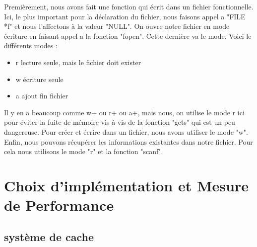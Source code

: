 \documentclass[12pt,a4paper]{article}
\begin{document}
\quad Premièrement, nous avons fait une fonction qui écrit dans un fichier fonctionnelle. Ici, le plus important
pour la déclaration du fichier, nous faisons appel a "FILE *f" et nous l'affectons à la valeur "NULL". On ouvre notre fichier en mode écriture en faisant appel a la fonction "fopen". Cette dernière va le mode. Voici le différents modes :
\begin{itemize}
    \item r {lecture seule, mais le fichier doit exister}
    \item w {écriture seule}
    \item a {ajout fin fichier}
\end{itemize}

\quad Il y en a beaucoup comme w+ ou r+ ou a+, mais nous, on utilise le mode r ici pour éviter la fuite de mémoire vis-à-vis de la fonction "gets" qui est un peu dangereuse. Pour créer et écrire dans un fichier, nous avons utiliser le mode "w". Enfin, nous pouvons récupérer les informations existantes dans notre fichier. Pour cela nous utilisons le mode "r" et la fonction "scanf".

\newpage
\section{Choix d'implémentation et Mesure de Performance}
\subsection{système de cache}
\end{document}
